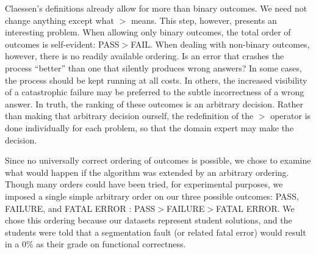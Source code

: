 \documentclass[11pt,twoside]{article}
\theoremstyle{definition}
\begin{document}
Claessen's definitions already allow for more than binary outcomes. We need not change anything except what $>$ means. This step, however, presents an interesting problem. When allowing only binary outcomes, the total order of outcomes is self-evident: PASS$>$FAIL. When dealing with non-binary outcomes, however, there is no readily available ordering. Is an error that crashes the process ``better'' than one that silently produces wrong answers? In some cases, the process should be kept running at all costs. In others, the increased visibility of a catastrophic failure may be preferred to the subtle incorrectness of a wrong answer. In truth, the ranking of these outcomes is an arbitrary decision. Rather than making that arbitrary decision ourself, the redefinition of the $>$ operator is done individually for each problem, so that the domain expert may make the decision.

Since no universally correct ordering of outcomes is possible, we chose to examine what would happen if the algorithm was extended by an arbitrary ordering. Though many orders could have been tried, for experimental purposes, we imposed a single simple arbitrary order on our three possible outcomes: PASS, FAILURE, and FATAL ERROR : PASS$>$FAILURE$>$FATAL ERROR. We chose this ordering because our datasets represent student solutions, and the students were told that a segmentation fault (or related fatal error) would result in a 0\% as their grade on functional correctness.
\end{document}
